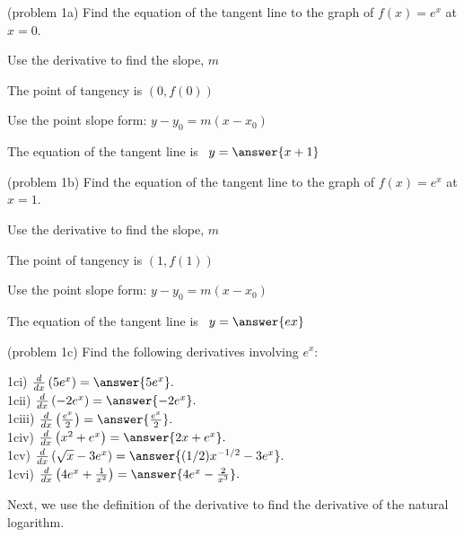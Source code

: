 \documentclass{ximera}
\begin{document}
\begin{problem}(problem 1a)
Find the equation of the tangent line to the graph of $f(x) = e^x$ at $x = 0$.
\begin{hint}
Use the derivative to find the slope, $m$
\end{hint}
\begin{hint}
The point of tangency is $(0, f(0))$
\end{hint}
\begin{hint}
Use the point slope form: $y-y_0 = m(x-x_0)$
\end{hint}

The equation of the tangent line is \ $y = \answer{x+1}$
\end{problem}

\begin{problem}(problem 1b)
Find the equation of the tangent line to the graph of $f(x) = e^x$ at $x = 1$.
\begin{hint}
Use the derivative to find the slope, $m$
\end{hint}
\begin{hint}
The point of tangency is $(1, f(1))$
\end{hint}
\begin{hint}
Use the point slope form: $y-y_0 = m(x-x_0)$
\end{hint}

The equation of the tangent line is \ $y = \answer{ex}$
\end{problem}


\begin{problem}(problem 1c)
Find the following derivatives involving $e^x$:

1ci) $\frac{d}{dx} \left(5e^x\right) = \answer{5e^x}.$\\
1cii) $\frac{d}{dx} \left(-2e^x\right) = \answer{-2e^x}.$\\
1ciii) $\frac{d}{dx} \left(\frac{e^x}{2}\right) = \answer{\frac{e^x}{2}}.$\\
1civ) $\frac{d}{dx} \left(x^2 + e^x\right) = \answer{2x + e^x}.$\\
1cv) $\frac{d}{dx} \left(\sqrt x - 3e^x\right) = \answer{(1/2)x^{-1/2} - 3e^x}.$\\
1cvi) $\frac{d}{dx} \left(4e^x + \frac{1}{x^2}\right) = \answer{4e^x -\frac{2}{x^3}}.$


\end{problem}


Next, we use the definition of the derivative to find the derivative of the natural logarithm.
\end{document}
